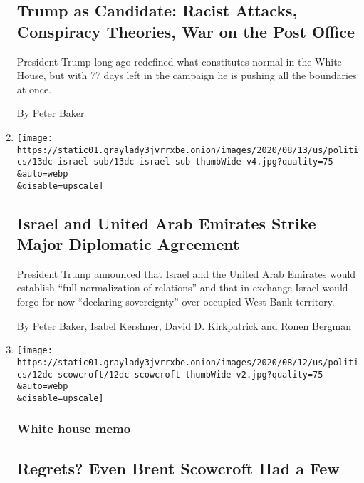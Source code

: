 \begin{enumerate}
  \hypertarget{trump-as-candidate-racist-attacks-conspiracy-theories-war-on-the-post-office}{%
  \subsection{Trump as Candidate: Racist Attacks, Conspiracy Theories,
  War on the Post
  Office}\label{trump-as-candidate-racist-attacks-conspiracy-theories-war-on-the-post-office}}

  President Trump long ago redefined what constitutes normal in the
  White House, but with 77 days left in the campaign he is pushing all
  the boundaries at once.

  By Peter Baker
\item
  \href{/2020/08/13/us/politics/trump-israel-united-arab-emirates-uae.html}{}

  \texttt{[image: https://static01.graylady3jvrrxbe.onion/images/2020/08/13/us/politics/13dc-israel-sub/13dc-israel-sub-thumbWide-v4.jpg?quality=75\\\&auto=webp\\\&disable=upscale]}

  \hypertarget{israel-and-united-arab-emirates-strike-major-diplomatic-agreement}{%
  \subsection{Israel and United Arab Emirates Strike Major Diplomatic
  Agreement}\label{israel-and-united-arab-emirates-strike-major-diplomatic-agreement}}

  President Trump announced that Israel and the United Arab Emirates
  would establish ``full normalization of relations'' and that in
  exchange Israel would forgo for now ``declaring sovereignty'' over
  occupied West Bank territory.

  By Peter Baker, Isabel Kershner, David D. Kirkpatrick and Ronen
  Bergman
\item
  \href{/2020/08/12/us/politics/brent-scowcroft.html}{}

  \texttt{[image: https://static01.graylady3jvrrxbe.onion/images/2020/08/12/us/politics/12dc-scowcroft/12dc-scowcroft-thumbWide-v2.jpg?quality=75\\\&auto=webp\\\&disable=upscale]}

  \hypertarget{white-house-memo}{%
  \subsubsection{White house memo}\label{white-house-memo}}

  \hypertarget{regrets-even-brent-scowcroft-had-a-few}{%
  \subsection{Regrets? Even Brent Scowcroft Had a
  Few}\label{regrets-even-brent-scowcroft-had-a-few}}


\end{enumerate}
